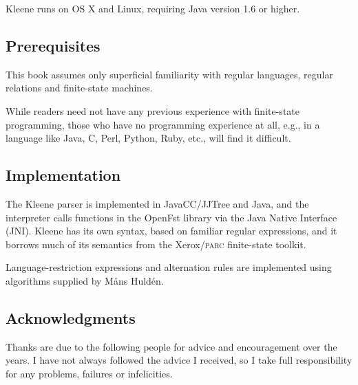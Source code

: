 \documentclass[letterpaper,12pt]{book}
\providecommand\acro[1]{}
\renewcommand\acro[1]{\textsc{#1}}
\providecommand{\init}{}\renewcommand{\init}{\MakeUppercase}
\newcommand{\Kleene}{Kleene}
\newcommand{\jni}{\init{jni}}
\newcommand{\CPP}{C\nolinebreak[4]\hspace{-.09em}\raisebox{.3ex}{\footnotesize\bf
+}\nolinebreak\hspace{-.25em}\raisebox{.3ex}{\footnotesize\bf +}}
\begin{document}
Kleene runs on OS X and Linux, requiring Java version 1.6 or higher. 

\subsection*{Prerequisites}

This book assumes only superficial familiarity with regular languages,
regular relations and finite-state machines.

While readers need not have any previous experience with finite-state
programming, those who have no programming experience at all, e.g., in a language
like Java, \CPP{}, Perl, Python, Ruby, etc., will find it difficult.

\subsection*{Implementation}

The \Kleene{} parser is implemented in
JavaCC/JJTree and
Java, and the
interpreter calls functions in the OpenFst library via the Java
Native Interface
(\jni).  Kleene has its own syntax, based on
familiar regular expressions, and it borrows much of its semantics from
the Xerox/\acro{parc} finite-state
toolkit.

Language-restriction expressions and alternation rules are implemented using
algorithms supplied by M\r{a}ns Huld\'en.

\subsection*{Acknowledgments}

Thanks are due to the following people for advice and encouragement over
the years.  I have not always followed the advice I received, so I take 
full responsibility for any problems, failures or infelicities.
\end{document}
